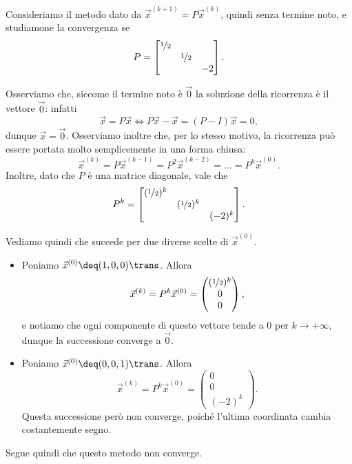 \begin{example}
    Consideriamo il metodo dato da $\vec x^{(k+1)} = P\vec x^{(k)}$, quindi senza termine noto, e studiamone la convergenza se \[
        P = \begin{bmatrix}
            \nicefrac12 & & \\
            & \nicefrac12 & \\
            & & -2
        \end{bmatrix}.
    \] 

    Osserviamo che, siccome il termine noto è $\vec 0$ la soluzione della ricorrenza è il vettore $\vec 0$: infatti \[
        \vec x = P\vec x \iff P\vec x - \vec x = (P - I)\vec x = 0,
    \] dunque $\vec x = \vec 0$.    
    Osserviamo inoltre che, per lo stesso motivo, la ricorrenza può essere portata molto semplicemente in una forma chiusa: \[
        \vec x^{(k)} = P\vec x^{(k-1)} = P^2\vec x^{(k-2)} = \dots = P^k\vec x^{(0)}.
    \] Inoltre, dato che $P$ è una matrice diagonale, vale che \[
        P^k = \begin{bmatrix}
            (\nicefrac12)^k & & \\
            & (\nicefrac12)^k & \\
            & & (-2)^k
        \end{bmatrix}.
    \]

    Vediamo quindi che succede per due diverse scelte di $\vec x^{(0)}$.
    \begin{itemize}
        \item Poniamo $\vec x^{(0)} \deq (1, 0, 0)\trans$. Allora \[
            \vec x^{(k)} = P^k\vec x^{(0)} = \begin{pmatrix}
                (\nicefrac12)^k \\ 0 \\0
            \end{pmatrix},
        \] e notiamo che ogni componente di questo vettore tende a $0$ per $k \to +\infty$, dunque la successione converge a $\vec 0$.
        \item Poniamo $\vec x^{(0)} \deq (0, 0, 1)\trans$. Allora \[
            \vec x^{(k)} = P^k\vec x^{(0)} = \begin{pmatrix}
                0 \\ 0\\ (-2)^k
            \end{pmatrix}.
        \] Questa successione però non converge, poiché l'ultima coordinata cambia costantemente segno.
    \end{itemize} 

    Segue quindi che questo metodo non converge.
\end{example}

